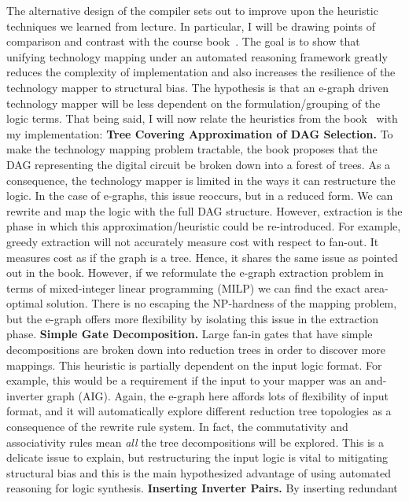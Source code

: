 \documentclass[10pt,letterpaper]{article}
\begin{document}
The alternative design of the compiler sets out to improve upon the heuristic
techniques we learned from lecture. In particular, I will be drawing points of
comparison and contrast with the course book~\cite{coursebook}. The goal is to
show that unifying technology mapping under an automated reasoning framework
greatly reduces the complexity of implementation and also increases the
resilience of the technology mapper to structural bias. The hypothesis is that
an e-graph driven technology mapper will be less dependent on the
formulation/grouping of the logic terms. That being said, I will now relate the
heuristics from the book~\cite{coursebook} with my implementation: \bigbreak{}
\noindent \textbf{Tree Covering Approximation of DAG Selection.} To make the
technology mapping problem tractable, the book proposes that the DAG
representing the digital circuit be broken down into a forest of trees. As a
consequence, the technology mapper is limited in the ways it can restructure
the logic. In the case of e-graphs, this issue reoccurs, but in a reduced form.
We can rewrite and map the logic with the full DAG structure. However,
extraction is the phase in which this approximation/heuristic could be
re-introduced. For example, greedy extraction will not accurately measure cost
with respect to fan-out. It measures cost as if the graph is a tree. Hence, it
shares the same issue as pointed out in the book. However, if we reformulate
the e-graph extraction problem in terms of mixed-integer linear programming
(MILP) we can find the exact area-optimal solution. There is no escaping the
NP-hardness of the mapping problem, but the e-graph offers more flexibility by
isolating this issue in the extraction phase. \bigbreak{} \noindent
\textbf{Simple Gate Decomposition.} Large fan-in gates that have simple
decompositions are broken down into reduction trees in order to discover more
mappings. This heuristic is partially dependent on the input logic format. For
example, this would be a requirement if the input to your mapper was an
and-inverter graph (AIG). Again, the e-graph here affords lots of flexibility
of input format, and it will automatically explore different reduction tree
topologies as a consequence of the rewrite rule system. In fact, the
commutativity and associativity rules mean \textit{all} the tree decompositions
will be explored. This is a delicate issue to explain, but restructuring the
input logic is vital to mitigating structural bias and this is the main
hypothesized advantage of using automated reasoning for logic synthesis.
\bigbreak{} \noindent \textbf{Inserting Inverter Pairs.} By inserting redundant
\end{document}

